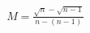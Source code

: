\documentclass[preview]{standalone}
\begin{document}
\begin{align*}
M = \frac{\sqrt{n}-\sqrt{n-1}} {n-(n-1)}
\end{align*}
\end{document}
